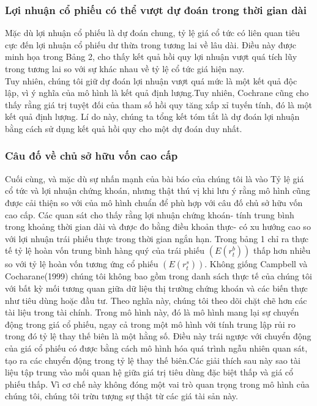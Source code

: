 \documentclass[10pt,a4paper]{article}
\begin{document}
	\subsubsection{Lợi nhuận cổ phiếu có thể vượt dự đoán trong thời gian dài}
	Mặc dù lợi nhuận cổ phiếu là dự đoán chung, tỷ lệ giá cổ tức có liên quan tiêu cực đến lợi nhuận cổ phiếu dư thừa trong tương lai về lâu dài. Điều này được minh họa
	trong Bảng 2, cho thấy kết quả hồi quy lợi nhuận vượt quá tích lũy trong tương lai so với sự khác nhau về tỷ lệ cổ tức giá hiện nay.\\
	Tuy nhiên, chúng tôi giữ dự đoán lợi nhuận vượt quá mức là một kết quả độc lập, vì ý nghĩa của mô hình là kết quả định lượng.Tuy nhiên, Cochrane cũng cho thấy rằng giá trị tuyệt đối của tham số hồi quy tăng xấp xỉ tuyến tính, đó là một kết quả định lượng. Lí do này, chúng ta tổng kết tóm tắt là dự đoán lợi nhuận bằng cách sử dụng kết quả hồi quy cho một dự đoán duy nhất.
	\subsubsection{Câu đố về chủ sở hữu vốn cao cấp}
	
	Cuối cùng, và mặc dù sự nhấn mạnh của bài báo của chúng tôi là vào
	Tỷ lệ giá cổ tức và lợi nhuận chứng khoán, nhưng thật thú vị khi lưu ý rằng mô hình cũng được cải thiện so với của mô hình chuẩn để phù hợp với câu đố chủ sở hữu vốn cao cấp.
	Các quan sát cho thấy rằng lợi nhuận chứng khoán- tính trung bình trong khoảng thời gian dài và được đo bằng điều khoản thực- có xu hướng cao so với lợi nhuận trái phiếu thực trong thời gian ngắn hạn. Trong bảng 1 chỉ ra thực tế tỷ lệ  hoàn vốn trung bình hàng quý
	của trái phiếu $(E(r^b_t))$ thấp hơn nhiều so với tỷ lệ hoàn vốn tương ứng
	cổ phiếu $(E(r^s_t)).$
	Không giống Campbell và Cocharane(1999) chúng tôi không bao gồm trong danh sách thực tế của chúng tôi với bất kỳ mối tương quan giữa dữ liệu thị trường chứng khoán và các biến thực như tiêu dùng
	hoặc đầu tư. 
	Theo nghĩa này, chúng tôi theo dõi chặt chẽ hơn các tài liệu trong tài chính. Trong
	mô hình này, đó là mô hình mang lại sự chuyển động trong giá cổ phiếu, ngay cả trong một mô hình với tính trung lập rủi ro trong đó tỷ lệ thay thế biên là một hằng số. Điều này trái ngược với  chuyển động của giá cổ phiếu có được bằng cách mô hình hóa quá trình ngẫu nhiên quan sát, tạo ra các chuyển động trong tỷ lệ thay thế biên.Các giải thích sau này  sao tài liệu tập trung vào mối quan hệ giữa giá trị tiêu dùng đặc biệt thấp và giá cổ phiếu thấp. Vì cơ chế này không đóng một vai trò quan trọng trong mô hình của chúng tôi, chúng tôi trừu tượng sự thật từ các giá tài sản này.
\end{document}
